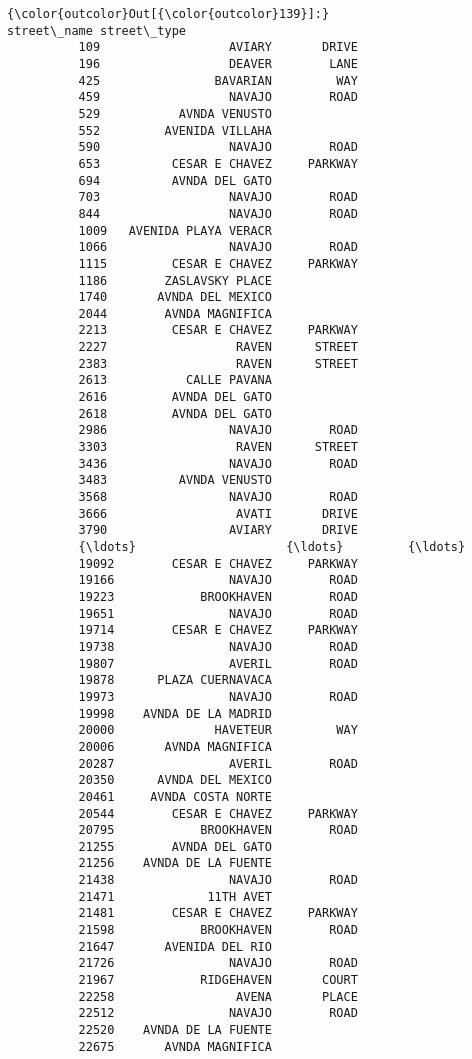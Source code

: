 \documentclass[11pt]{article}
\begin{document}
\begin{Verbatim}[commandchars=\\\{\}]
{\color{outcolor}Out[{\color{outcolor}139}]:}                 street\_name street\_type
          109                  AVIARY       DRIVE
          196                  DEAVER        LANE
          425                BAVARIAN         WAY
          459                  NAVAJO        ROAD
          529           AVNDA VENUSTO            
          552         AVENIDA VILLAHA            
          590                  NAVAJO        ROAD
          653          CESAR E CHAVEZ     PARKWAY
          694          AVNDA DEL GATO            
          703                  NAVAJO        ROAD
          844                  NAVAJO        ROAD
          1009   AVENIDA PLAYA VERACR            
          1066                 NAVAJO        ROAD
          1115         CESAR E CHAVEZ     PARKWAY
          1186        ZASLAVSKY PLACE            
          1740       AVNDA DEL MEXICO            
          2044        AVNDA MAGNIFICA            
          2213         CESAR E CHAVEZ     PARKWAY
          2227                  RAVEN      STREET
          2383                  RAVEN      STREET
          2613           CALLE PAVANA            
          2616         AVNDA DEL GATO            
          2618         AVNDA DEL GATO            
          2986                 NAVAJO        ROAD
          3303                  RAVEN      STREET
          3436                 NAVAJO        ROAD
          3483          AVNDA VENUSTO            
          3568                 NAVAJO        ROAD
          3666                  AVATI       DRIVE
          3790                 AVIARY       DRIVE
          {\ldots}                     {\ldots}         {\ldots}
          19092        CESAR E CHAVEZ     PARKWAY
          19166                NAVAJO        ROAD
          19223            BROOKHAVEN        ROAD
          19651                NAVAJO        ROAD
          19714        CESAR E CHAVEZ     PARKWAY
          19738                NAVAJO        ROAD
          19807                AVERIL        ROAD
          19878      PLAZA CUERNAVACA            
          19973                NAVAJO        ROAD
          19998    AVNDA DE LA MADRID            
          20000              HAVETEUR         WAY
          20006       AVNDA MAGNIFICA            
          20287                AVERIL        ROAD
          20350      AVNDA DEL MEXICO            
          20461     AVNDA COSTA NORTE            
          20544        CESAR E CHAVEZ     PARKWAY
          20795            BROOKHAVEN        ROAD
          21255        AVNDA DEL GATO            
          21256    AVNDA DE LA FUENTE            
          21438                NAVAJO        ROAD
          21471             11TH AVET            
          21481        CESAR E CHAVEZ     PARKWAY
          21598            BROOKHAVEN        ROAD
          21647       AVENIDA DEL RIO            
          21726                NAVAJO        ROAD
          21967            RIDGEHAVEN       COURT
          22258                 AVENA       PLACE
          22512                NAVAJO        ROAD
          22520    AVNDA DE LA FUENTE            
          22675       AVNDA MAGNIFICA            
          

\end{Verbatim}
\end{document}
